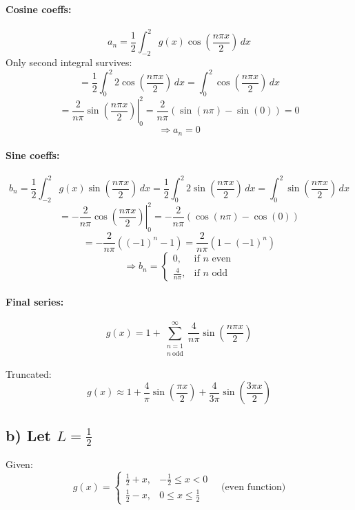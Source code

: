 \documentclass{article}
\begin{document}
\paragraph{Cosine coeffs:}
\[
a_n = \frac{1}{2} \int_{-2}^{2} g(x) \cos\left( \frac{n\pi x}{2} \right)\,dx
\]
Only second integral survives:
\[
= \frac{1}{2} \int_0^2 2 \cos\left( \frac{n\pi x}{2} \right)\,dx = \int_0^2 \cos\left( \frac{n\pi x}{2} \right)\,dx
\]
\[
= \left. \frac{2}{n\pi} \sin\left( \frac{n\pi x}{2} \right) \right|_0^2 = \frac{2}{n\pi} ( \sin(n\pi) - \sin(0) ) = 0
\]
\[
\Rightarrow a_n = 0
\]

\paragraph{Sine coeffs:}
\[
b_n = \frac{1}{2} \int_{-2}^{2} g(x) \sin\left( \frac{n\pi x}{2} \right)\,dx
= \frac{1}{2} \int_0^2 2 \sin\left( \frac{n\pi x}{2} \right)\,dx
= \int_0^2 \sin\left( \frac{n\pi x}{2} \right)\,dx
\]
\[
= \left. -\frac{2}{n\pi} \cos\left( \frac{n\pi x}{2} \right) \right|_0^2
= -\frac{2}{n\pi} \left( \cos(n\pi) - \cos(0) \right)
\]
\[
= -\frac{2}{n\pi} \left( (-1)^n - 1 \right) = \frac{2}{n\pi} (1 - (-1)^n)
\]
\[
\Rightarrow b_n =
\begin{cases}
0, & \text{if } n \text{ even} \\
\frac{4}{n\pi}, & \text{if } n \text{ odd}
\end{cases}
\]

\paragraph{Final series:}
\[
g(x) = 1 + \sum_{\substack{n=1 \\ n\ \text{odd}}}^\infty \frac{4}{n\pi} \sin\left( \frac{n\pi x}{2} \right)
\]

Truncated:
\[
g(x) \approx 1 + \frac{4}{\pi} \sin\left( \frac{\pi x}{2} \right) + \frac{4}{3\pi} \sin\left( \frac{3\pi x}{2} \right)
\]

\subsection*{b) Let \( L = \frac{1}{2} \)}

Given:
\[
g(x) =
\begin{cases}
\frac{1}{2} + x, & -\frac{1}{2} \le x < 0 \\
\frac{1}{2} - x, & 0 \le x \le \frac{1}{2}
\end{cases}
\quad \text{(even function)}
\]
\end{document}
